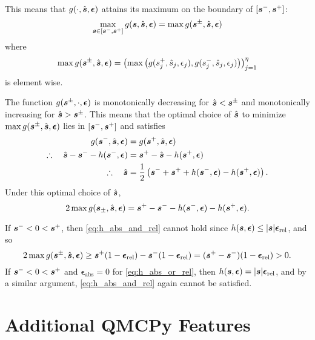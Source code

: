 \documentclass{article}
\newcommand{\bepsabs}{\boldsymbol{\epsilon}_\text{abs}}
\newcommand{\bepsrel}{\boldsymbol{\epsilon}_\text{rel}}
\newcommand{\bepsabs}{\epsilon_\text{abs}}
\newcommand{\bepsabs}{\epsilon_\text{rel}}
\begin{document}
This means that $g(\cdot,\hat{\boldsymbol{s}},\boldsymbol{\epsilon})$ attains its maximum on the boundary of $[\boldsymbol{s}^-,\boldsymbol{s}^+]$:
\begin{equation}
    \max_{\boldsymbol{s} \in [\boldsymbol{s}^-,\boldsymbol{s}^+]} g(\boldsymbol{s},\hat{\boldsymbol{s}},\boldsymbol{\epsilon}) = \max g(\boldsymbol{s}^\pm,\hat{\boldsymbol{s}},\boldsymbol{\epsilon})
\end{equation}
where
\begin{equation}
    \max g(\boldsymbol{s}^\pm,\hat{\boldsymbol{s}},\boldsymbol{\epsilon}) = \left(\max\left(g(s_j^+,\hat{s}_j,\epsilon_j),g(s_j^-,\hat{s}_j,\epsilon_j)\right)\right)_{j=1}^\eta
\end{equation}
is element wise. 

The function $g(\boldsymbol{s}^\pm,\cdot,\boldsymbol{\epsilon})$ is monotonically decreasing for $\hat{\boldsymbol{s}} < \boldsymbol{s}^\pm$ and monotonically increasing for $\hat{\boldsymbol{s}} > \boldsymbol{s}^\pm$. This means that the optimal choice of $\hat{\boldsymbol{s}}$ to minimize $\max g(\boldsymbol{s}^\pm,\hat{\boldsymbol{s}},\boldsymbol{\epsilon})$ lies in $[\boldsymbol{s}^-,\boldsymbol{s}^+]$ and satisfies
\begin{align}
    g(\boldsymbol{s}^-,\hat{\boldsymbol{s}},\boldsymbol{\epsilon}) &= g(\boldsymbol{s}^+,\hat{\boldsymbol{s}},\boldsymbol{\epsilon}) \\
    \therefore \quad \hat{\boldsymbol{s}} - \boldsymbol{s}^- - h(\boldsymbol{s}^-,\boldsymbol{\epsilon}) &= \boldsymbol{s}^+ - \hat{\boldsymbol{s}} - h(\boldsymbol{s}^+,\boldsymbol{\epsilon}) \\ 
    \therefore \quad \hat{\boldsymbol{s}} &= \frac{1}{2}\left( \boldsymbol{s}^- + \boldsymbol{s}^+ +h(\boldsymbol{s}^-,\boldsymbol{\epsilon}) - h(\boldsymbol{s}^+,\boldsymbol{\epsilon}) \right).
\end{align}
Under this optimal choice of $\hat{\boldsymbol{s}}$, 
\begin{equation*}
    2 \max g(\boldsymbol{s}_\pm,\hat{\boldsymbol{s}},\boldsymbol{\epsilon}) =  \boldsymbol{s}^+  -  \boldsymbol{s}^-  - h(\boldsymbol{s}^-,\boldsymbol{\epsilon}) - h(\boldsymbol{s}^+,\boldsymbol{\epsilon}).
\end{equation*}

If $\boldsymbol{s}^- < 0 < \boldsymbol{s}^+$, then \eqref{eq:h_abs_and_rel} cannot hold since $h(\bs,\bepsilon) \le \lvert \bs \rvert \bepsrel$, and so
\begin{equation*}
2 \max g(\bs^\pm,\hat{\bs},\bepsilon) \ge \bs^+ (1 - \bepsrel) - \bs^- (1  - \bepsrel) = (\bs^+ - \bs^-)(1 - \bepsrel) > 0.
\end{equation*}
If $\boldsymbol{s}^- < 0 < \boldsymbol{s}^+$ and $\bepsabs = 0$ for \eqref{eq:h_abs_or_rel}, then $h(\bs,\bepsilon) = \lvert \bs \rvert \bepsrel$, and by a similar argument, \eqref{eq:h_abs_and_rel} again cannot be satisfied.

\section{Additional QMCPy Features}

\end{document}
